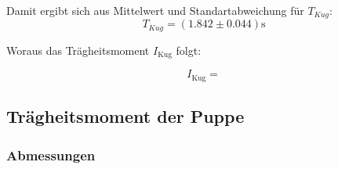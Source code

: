 Damit ergibt sich aus Mittelwert und Standartabweichung für $T_{Kug}$:
\begin{equation*}
  T_{Kug} = (1.842 \pm 0.044) \unit\second
\end{equation*}

Woraus das Trägheitsmoment $I_{\text{Kug}}$ folgt:



\begin{equation*}
  I_{\text{Kug}} = 
\end{equation*}



\subsection{Trägheitsmoment der Puppe}

\subsubsection{Abmessungen}

